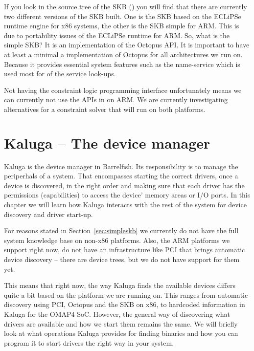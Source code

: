 \documentclass[a4paper,11pt,twoside]{report}
\begin{document}
If you look in the source tree of the SKB () you will find
that there are currently two different versions of the SKB built. One is the
SKB based on the ECLiPSe runtime engine for x86 systems, the other is the SKB
simple for ARM. This is due to portability issues of the ECLiPSe runtime for
ARM. So, what is the simple SKB? It is an implementation of the Octopus API.
It is important to have at least a minimal a implementation of Octopus for all
architectures we run on. Because it provides essential system features such as
the name-service which is used most for of the service look-ups.

Not having the constraint logic programming interface unfortunately means we
can currently not use the APIs in  on ARM. We are currently
investigating alternatives for a constraint solver that will run on both
platforms.

\chapter{Kaluga -- The device manager}


Kaluga is the device manager in Barrelfish. Its responsibility is to manage
the periperhals of a system. That encompasses starting the correct drivers,
once a device is discovered, in the right order and making sure that each driver
has the permissions (capabilities) to access the device' memory areas
or I/O ports. In this chapter we will learn how Kaluga interacts with the
rest of the system for device discovery and driver start-up.

For reasons stated in Section~\ref{sec:simpleskb} we currently do not have the
full system knowledge base on non-x86 platforms. Also, the ARM platforms we
support right now, do not have an infrastructure like PCI that brings
automatic device discovery -- there are device trees, but we do not
have support for them yet.

This means that right now, the way Kaluga finds the available devices differs
quite a bit based on the platform we are running on. This ranges from
automatic discovery using PCI, Octopus and the SKB on x86, to hardcoded
information in Kaluga for the OMAP4 SoC. However, the general way of
discovering what drivers are available and how we start them remains the same.
We will briefly look at what operations Kaluga provides for finding binaries
and how you can program it to start drivers the right way in your system.
\end{document}
